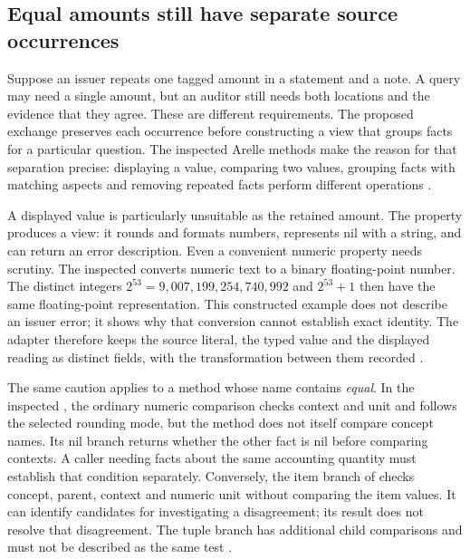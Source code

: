 \subsection{Equal amounts still have separate source occurrences}

Suppose an issuer repeats one tagged amount in a statement and a note. A query
may need a single amount, but an auditor still needs both locations and the
evidence that they agree. These are different requirements. The proposed
exchange preserves each occurrence before constructing a view that groups
facts for a particular question. The inspected Arelle methods make the reason
for that separation precise: displaying a value, comparing two values,
grouping facts with matching aspects and removing repeated facts perform
different operations \citep{arellefactidentity2026}.

A displayed value is particularly unsuitable as the retained amount. The
 property produces a view: it rounds and formats numbers,
represents nil with a string, and can return an error description. Even a
convenient numeric property needs scrutiny. The inspected 
converts numeric text to a binary floating-point number. The distinct integers
$2^{53}=9{,}007{,}199{,}254{,}740{,}992$ and $2^{53}+1$ then have the same
floating-point representation. This constructed example does not describe an
issuer error; it shows why that conversion cannot establish exact identity.
The adapter therefore keeps the source literal, the typed value and the
displayed reading as distinct fields, with the transformation between them
recorded \citep{arellefactidentity2026}.

The same caution applies to a method whose name contains \emph{equal}. In the
inspected , the ordinary numeric comparison checks context
and unit and follows the selected rounding mode, but the method does not itself
compare concept names. Its nil branch returns whether the other fact is nil
before comparing contexts. A caller needing facts about the same accounting
quantity must establish that condition separately. Conversely, the item branch
of  checks concept, parent, context and numeric unit
without comparing the item values. It can identify candidates for investigating
a disagreement; its result does not resolve that disagreement. The tuple
branch has additional child comparisons and must not be described as the same
test \citep{arellefactidentity2026}.

